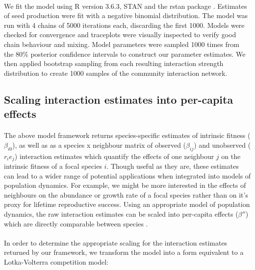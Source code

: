 \documentclass[a4,12pt]{article}
\begin{document}
        \paragraph{}
        We fit the model using R version 3.6.3, STAN and the rstan package \parencite{R2020, Carpenter2017, Rstan2020}. Estimates of seed production were fit with a negative binomial distribution. The model was run with 4 chains of 5000 iterations each, discarding the first 1000. Models were checked for convergence and traceplots were visually inspected to verify good chain behaviour and mixing. Model parameters were sampled 1000 times from the 80\% posterior confidence intervals to construct our parameter estimates. We then applied bootstrap sampling from each resulting interaction strength distribution to create 1000 samples of the community interaction network.

        \subsection{Scaling interaction estimates into per-capita effects}

        \paragraph{}
        The above model framework returns species-specific estimates of intrinsic fitness ($\beta_{i0}$), as well as as a species x neighbour matrix of observed ($\beta_{ij}$) and unobserved ($r_i e_j$) interaction estimates which quantify the effects of one neighbour $j$ on the intrinsic fitness of a focal species $i$. Though useful as they are, these estimates can lead to a wider range of potential applications when integrated into models of population dynamics. For example, we might be more interested in the effects of neighbours on the abundance or growth rate of a focal species rather than on it's proxy for lifetime reproductive success. Using an appropriate model of population dynamics, the raw interaction estimates can be scaled into per-capita effects (${\beta}''$) which are directly comparable between species \parencite{Godoy2014, Bimler2018}. %

        \paragraph{}
		In order to determine the appropriate scaling for the interaction estimates returned by our framework, we transform the model into a form equivalent to a Lotka-Volterra competition model: 
\end{document}
